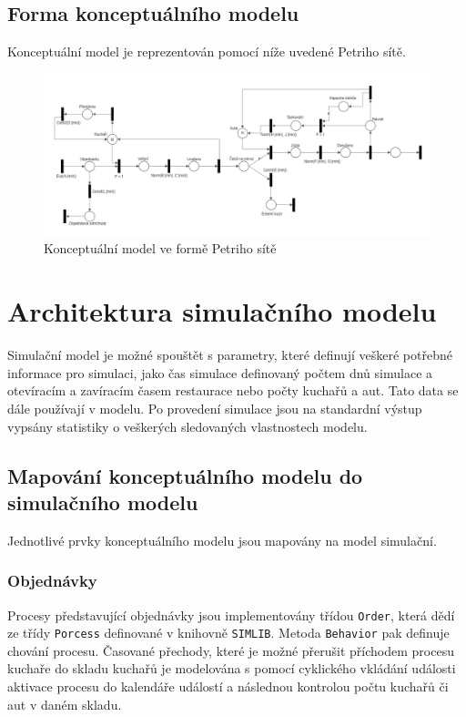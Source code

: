 \documentclass[a4paper, 11pt]{article}
\begin{document}
\subsection{Forma konceptuálního modelu}
Konceptuální model je reprezentován pomocí níže uvedené Petriho sítě.

\begin{figure}[h]
\centering
\includegraphics[width=16cm]{petriNet}
\caption{Konceptuální model ve formě Petriho sítě}
\label{fig:1}
\end{figure}

\section{Architektura simulačního modelu}
Simulační model je možné spouštět s parametry, které definují veškeré potřebné informace pro simulaci, jako čas simulace definovaný počtem dnů simulace a otevíracím a zavíracím časem restaurace nebo počty kuchařů a aut. Tato data se dále používají v modelu. Po provedení simulace jsou na standardní výstup vypsány statistiky o veškerých sledovaných vlastnostech modelu.

\subsection{Mapování konceptuálního modelu do simulačního modelu}
Jednotlivé prvky konceptuálního modelu jsou mapovány na model simulační.
 
 \subsubsection{Objednávky}
Procesy představující objednávky jsou implementovány třídou \texttt{Order}, která dědí ze třídy \texttt{Porcess} definované v knihovně \texttt{SIMLIB}. Metoda \texttt{Behavior} \cite[snímek 169]{IMS_course} pak definuje chování procesu. Časované přechody, které je možné přerušit příchodem procesu kuchaře do skladu kuchařů je modelována s pomocí cyklického vkládání události aktivace procesu \cite[snímek 169]{IMS_course} do kalendáře událostí \cite[snímek 173]{IMS_course} a následnou kontrolou počtu kuchařů či aut v daném skladu. 
\end{document}
